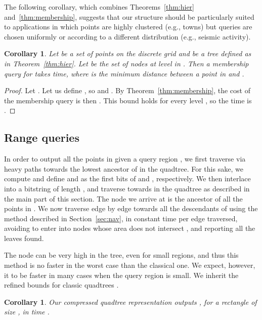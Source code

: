 \documentclass{elsarticle}
\newtheorem{corollary}[theorem]{Corollary}
\begin{document}
The following corollary, which combines Theorems~\ref{thm:hier} and~\ref{thm:membership}, suggests that our structure should be particularly suited to applications in which points are highly clustered (e.g., towns) but queries are chosen uniformly or according to a different distribution (e.g., seismic activity). 

\begin{corollary} 
\label{cor:hier-query}
Let  be a set of points on the discrete grid  and
 be a tree defined as in Theorem~\ref{thm:hier}.
Let  be the set of nodes at level  in . Then a membership query for  takes  time, where  is the minimum distance between a point in  and .
\end{corollary}
\begin{proof}
Let . Let us define
, so 
and . By Theorem~\ref{thm:membership}, the cost
of the membership query is then . This 
bound holds for every level , so the time is .
\end{proof}



\subsection{Range queries}

In order to output all the points in  given a query region , we first traverse via heavy paths towards the lowest ancestor of  in the quadtree. For this sake, we compute  and define  and  as the first  bits of  and , respectively. We then interlace  into a bitstring  of length , and traverse towards  in the quadtree as described in the main part of this section. The node  we arrive at is the ancestor of all the points in . We now traverse edge by edge towards all the descendants of  using the method described in Section~\ref{sec:nav}, in constant time per edge traversed, avoiding to enter into nodes whose area does not intersect , and reporting all the leaves found.

The node  can be very high in the tree, even for small regions, and thus this method is no faster in the worst case than the classical one. We expect, however, it to be faster in many cases when the query region is small. We inherit the
refined bounds for classic quadtrees \cite[p.~361]{Nav16}.

\begin{corollary}
Our compressed quadtree representation outputs , for a rectangle  of size , in time .
\end{corollary}
\end{document}
